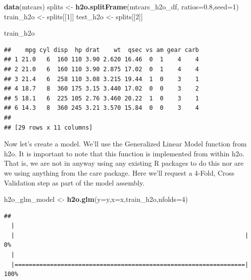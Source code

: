 \documentclass[]{book}
\newenvironment{Shaded}{\begin{snugshade}}{\end{snugshade}}
\newcommand{\KeywordTok}[1]{\textcolor[rgb]{0.13,0.29,0.53}{\textbf{#1}}}
\newcommand{\DataTypeTok}[1]{\textcolor[rgb]{0.13,0.29,0.53}{#1}}
\newcommand{\DecValTok}[1]{\textcolor[rgb]{0.00,0.00,0.81}{#1}}
\newcommand{\FloatTok}[1]{\textcolor[rgb]{0.00,0.00,0.81}{#1}}
\newcommand{\StringTok}[1]{\textcolor[rgb]{0.31,0.60,0.02}{#1}}
\newcommand{\NormalTok}[1]{#1}
\begin{document}
\begin{Shaded}
\begin{Highlighting}[]
\KeywordTok{data}\NormalTok{(mtcars)}
\NormalTok{splits <-}\StringTok{ }\KeywordTok{h2o.splitFrame}\NormalTok{(mtcars_h2o_df, }\DataTypeTok{ratios=}\FloatTok{0.8}\NormalTok{,}\DataTypeTok{seed=}\DecValTok{1}\NormalTok{)}
\NormalTok{train_h2o <-}\StringTok{ }\NormalTok{splits[[}\DecValTok{1}\NormalTok{]]}
\NormalTok{test_h2o  <-}\StringTok{ }\NormalTok{splits[[}\DecValTok{2}\NormalTok{]]}

\NormalTok{train_h2o}
\end{Highlighting}
\end{Shaded}

\begin{verbatim}
##    mpg cyl disp  hp drat    wt  qsec vs am gear carb
## 1 21.0   6  160 110 3.90 2.620 16.46  0  1    4    4
## 2 21.0   6  160 110 3.90 2.875 17.02  0  1    4    4
## 3 21.4   6  258 110 3.08 3.215 19.44  1  0    3    1
## 4 18.7   8  360 175 3.15 3.440 17.02  0  0    3    2
## 5 18.1   6  225 105 2.76 3.460 20.22  1  0    3    1
## 6 14.3   8  360 245 3.21 3.570 15.84  0  0    3    4
## 
## [29 rows x 11 columns]
\end{verbatim}

Now let's create a model. We'll use the Generalized Linear Model
function from h2o. It is important to note that this function is
implemented from within h2o. That is, we are not in anyway using any
existing R packages to do this nor are we using anything from the care
package. Here we'll request a 4-Fold, Cross Validation step as part of
the model assembly.

\begin{Shaded}
\begin{Highlighting}[]
\NormalTok{h2o_glm_model <-}\StringTok{ }\KeywordTok{h2o.glm}\NormalTok{(}\DataTypeTok{y=}\NormalTok{y,}\DataTypeTok{x=}\NormalTok{x,train_h2o,}\DataTypeTok{nfolds=}\DecValTok{4}\NormalTok{)}
\end{Highlighting}
\end{Shaded}

\begin{verbatim}
## 
  |                                                                       
  |                                                                 |   0%
  |                                                                       
  |=================================================================| 100%
\end{verbatim}
\end{document}
